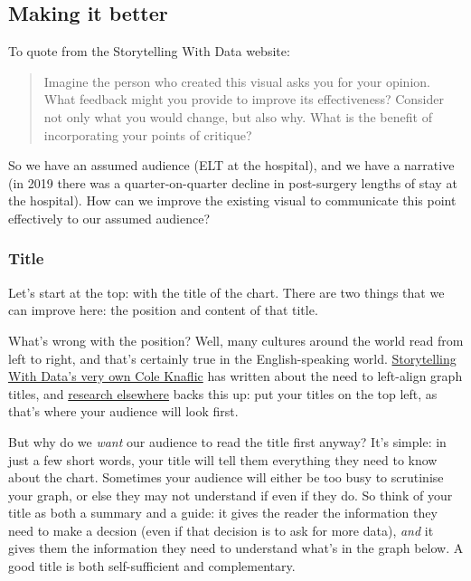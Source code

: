 \documentclass[
  letterpaper,
  DIV=11,
  numbers=noendperiod]{scrartcl}
\begin{document}
\hypertarget{making-it-better}{%
\subsection{Making it better}\label{making-it-better}}

To quote from the Storytelling With Data website:

\begin{quote}
Imagine the person who created this visual asks you for your opinion.
What feedback might you provide to improve its effectiveness? Consider
not only what you would change, but also why. What is the benefit of
incorporating your points of critique?
\end{quote}

So we have an assumed audience (ELT at the hospital), and we have a
narrative (in 2019 there was a quarter-on-quarter decline in
post-surgery lengths of stay at the hospital). How can we improve the
existing visual to communicate this point effectively to our assumed
audience?

\hypertarget{title}{%
\subsubsection{Title}\label{title}}

Let's start at the top: with the title of the chart. There are two
things that we can improve here: the position and content of that title.

What's wrong with the position? Well, many cultures around the world
read from left to right, and that's certainly true in the
English-speaking world.
\href{https://www.storytellingwithdata.com/blog/2012/09/quick-tip-left-uppermost-align-title}{Storytelling
With Data's very own Cole Knaflic} has written about the need to
left-align graph titles, and
\href{https://web.archive.org/web/20130310105837/http://styleguide.yahoo.com/writing/write-web/eye-tracking-where-do-readers-look-first}{research
elsewhere} backs this up: put your titles on the top left, as that's
where your audience will look first.

But why do we \emph{want} our audience to read the title first anyway?
It's simple: in just a few short words, your title will tell them
everything they need to know about the chart. Sometimes your audience
will either be too busy to scrutinise your graph, or else they may not
understand if even if they do. So think of your title as both a summary
and a guide: it gives the reader the information they need to make a
decsion (even if that decision is to ask for more data), \emph{and} it
gives them the information they need to understand what's in the graph
below. A good title is both self-sufficient and complementary.
\end{document}
